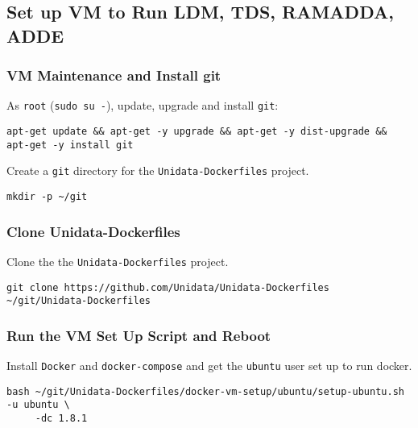 \documentclass[onecolumn,9pt]{article}
\begin{document}
\subsection{Set up VM to Run LDM, TDS, RAMADDA, ADDE}
\label{sec:orgheadline32}
\subsubsection{VM Maintenance and Install git}
\label{sec:orgheadline14}

As \texttt{root} (\texttt{sudo su -}), update, upgrade and install \texttt{git}:

\lstset{frame=lines,basicstyle=\footnotesize,numbers=left,numberstyle=\tiny,language=sh,label= ,caption= ,captionpos=b}
\begin{lstlisting}
apt-get update && apt-get -y upgrade && apt-get -y dist-upgrade && apt-get -y install git
\end{lstlisting}

Create a \texttt{git} directory for the \texttt{Unidata-Dockerfiles} project.

\lstset{frame=lines,basicstyle=\footnotesize,numbers=left,numberstyle=\tiny,language=sh,label= ,caption= ,captionpos=b}
\begin{lstlisting}
mkdir -p ~/git
\end{lstlisting}

\subsubsection{Clone Unidata-Dockerfiles}
\label{sec:orgheadline15}

Clone the the \texttt{Unidata-Dockerfiles} project.

\lstset{frame=lines,basicstyle=\footnotesize,numbers=left,numberstyle=\tiny,language=:eval,label= ,caption= ,captionpos=b}
\begin{lstlisting}
git clone https://github.com/Unidata/Unidata-Dockerfiles ~/git/Unidata-Dockerfiles
\end{lstlisting}

\subsubsection{Run the VM Set Up Script and Reboot}
\label{sec:orgheadline16}

Install \texttt{Docker} and \texttt{docker-compose} and get the \texttt{ubuntu} user set up to run docker.

\lstset{frame=lines,basicstyle=\footnotesize,numbers=left,numberstyle=\tiny,language=sh,label= ,caption= ,captionpos=b}
\begin{lstlisting}
bash ~/git/Unidata-Dockerfiles/docker-vm-setup/ubuntu/setup-ubuntu.sh -u ubuntu \
     -dc 1.8.1
\end{lstlisting}
\end{document}
